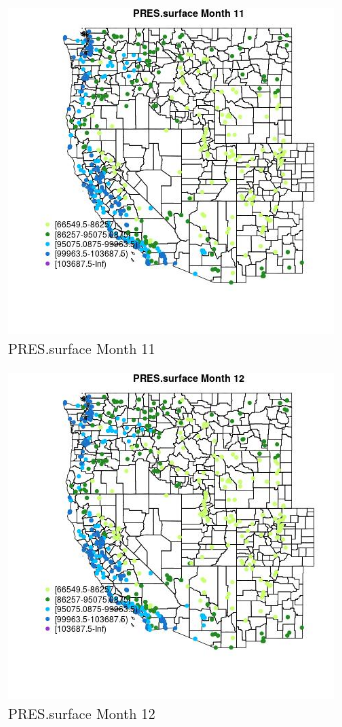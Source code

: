 \begin{figure} 
\centering  
\includegraphics[width=0.77\textwidth]{Code_Outputs/Report_ML_input_PM25_Step4_part_e_de_duplicated_aves_compiled_2019-05-14wNAs_MapObsMo11PRESsurface.jpg} 
\caption{\label{fig:Report_ML_input_PM25_Step4_part_e_de_duplicated_aves_compiled_2019-05-14wNAsMapObsMo11PRESsurface}PRES.surface Month 11} 
\end{figure} 
 

\begin{figure} 
\centering  
\includegraphics[width=0.77\textwidth]{Code_Outputs/Report_ML_input_PM25_Step4_part_e_de_duplicated_aves_compiled_2019-05-14wNAs_MapObsMo12PRESsurface.jpg} 
\caption{\label{fig:Report_ML_input_PM25_Step4_part_e_de_duplicated_aves_compiled_2019-05-14wNAsMapObsMo12PRESsurface}PRES.surface Month 12} 
\end{figure} 
 

